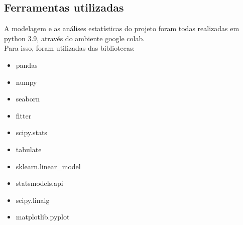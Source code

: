 \subsection{Ferramentas utilizadas}
A modelagem e as análises estatísticas do projeto foram todas realizadas em python 3.9, através do ambiente google colab.\\
Para isso, foram utilizadas das bibliotecas:
\begin{itemize}
    \item pandas
    \item numpy
    \item seaborn
    \item fitter
    \item scipy.stats
    \item tabulate
    \item sklearn.linear\_model
    \item statsmodels.api
    \item scipy.linalg
    \item matplotlib.pyplot
    \end{itemize}
